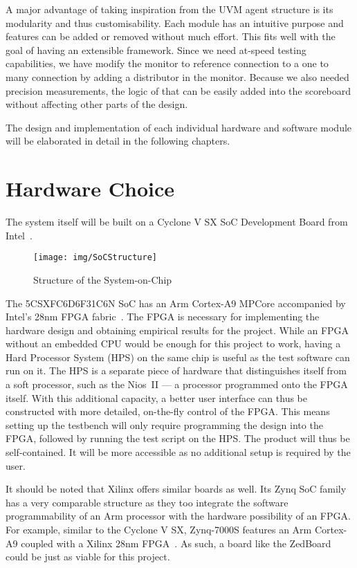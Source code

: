 A major advantage of taking inspiration from the UVM agent structure is its modularity and thus customisability.
Each module has an intuitive purpose and features can be added or removed without much effort.
This fits well with the goal of having an extensible framework.
Since we need at-speed testing capabilities, we have modify the monitor to reference connection to a one to many connection by adding a distributor in the monitor.
Because we also needed precision measurements, the logic of that can be easily added into the scoreboard without affecting other parts of the design.

The design and implementation of each individual hardware and software module will be elaborated in detail in the following chapters.

\section{Hardware Choice}
The system itself will be built on a Cyclone V SX SoC Development Board from Intel~\cite{Intel1}.

\begin{figure}[H]
  \centering
  \texttt{[image: img/SoCStructure]}
  \caption{Structure of the System-on-Chip}
  \label{SoCStructure}
\end{figure}

The 5CSXFC6D6F31C6N SoC has an Arm Cortex-A9 MPCore accompanied by Intel's 28nm FPGA fabric~\cite{Altera1}.
The FPGA is necessary for implementing the hardware design and obtaining empirical results for the project.
While an FPGA without an embedded CPU would be enough for this project to work, having a Hard Processor System (HPS) on the same chip is useful as the test software can run on it.
The HPS is a separate piece of hardware that distinguishes itself from a soft processor, such as the Nios~II --- a processor programmed onto the FPGA itself.
With this additional capacity, a better user interface can thus be constructed with more detailed, on-the-fly control of the FPGA.
This means setting up the testbench will only require programming the design into the FPGA, followed by running the test script on the HPS.
The product will thus be self-contained.
It will be more accessible as no additional setup is required by the user.

It should be noted that Xilinx offers similar boards as well.
Its Zynq SoC family has a very comparable structure as they too integrate the software programmability of an Arm processor with the hardware possibility of an FPGA.
For example, similar to the Cyclone V SX, Zynq-7000S features an Arm Cortex-A9
coupled with a Xilinx 28nm FPGA~\cite{Xilinx1}.
As such, a board like the ZedBoard~\cite{Xilinx2} could be just as viable for this project.

